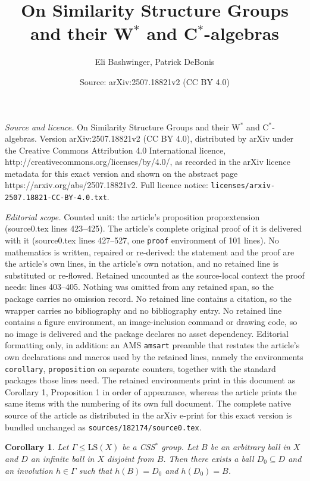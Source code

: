 \documentclass[10pt,a4paper]{amsart}
\title{On Similarity Structure Groups and their W$^*$ and C$^*$-algebras}
\author{Eli Bashwinger, Patrick DeBonis}
\date{Source: arXiv:2507.18821v2 (CC BY 4.0)}
\newtheorem{corollary}{Corollary}
\begin{document}
\maketitle

\noindent\emph{Source and licence.} On Similarity Structure Groups and their W$^*$ and C$^*$-algebras. Version arXiv:2507.18821v2 (CC BY 4.0), distributed by arXiv under the Creative Commons Attribution 4.0 International licence, http://creativecommons.org/licenses/by/4.0/, as recorded in the arXiv licence metadata for this exact version and shown on the abstract page https://arxiv.org/abs/2507.18821v2. Full licence notice: \texttt{licenses/arxiv-2507.18821-CC-BY-4.0.txt}.\par\smallskip

\noindent\textit{Editorial scope.} Counted unit: the article's proposition prop:extension (source0.tex lines 423--425). The article's complete original proof of it is delivered with it (source0.tex lines 427--527, one \texttt{proof} environment of 101 lines). No mathematics is written, repaired or re-derived: the statement and the proof are the article's own lines, in the article's own notation, and no retained line is substituted or re-flowed.  Retained uncounted as the source-local context the proof needs: lines 403--405.  Nothing was omitted from any retained span, so the package carries no omission record.  No retained line contains a citation, so the wrapper carries no bibliography and no bibliography entry.  No retained line contains a figure environment, an image-inclusion command or drawing code, so no image is delivered and the package declares no asset dependency.  Editorial formatting only, in addition: an AMS \texttt{amsart} preamble that restates the article's own declarations and macros used by the retained lines, namely the environments \texttt{corollary}, \texttt{proposition} on separate counters, together with the standard packages those lines need.  The retained environments print in this document as Corollary 1, Proposition 1 in order of appearance, whereas the article prints the same items with the numbering of its own full document.  The complete native source of the article as distributed in the arXiv e-print for this exact version is bundled unchanged as \texttt{sources/182174/source0.tex}.
\begin{corollary}\label{cor:extension}
Let $\Gamma \leq \text{LS}(X)$ be a CSS$^*$ group. Let $B$ be an arbitrary ball in $X$ and $D$ an infinite ball in $X$ disjoint from $B$. Then there exists a ball $D_0 \subseteq D$  and an involution $h \in \Gamma $ such that $h(B) = D_0$ and $h(D_0) = B$. 
\end{corollary}
\end{document}
